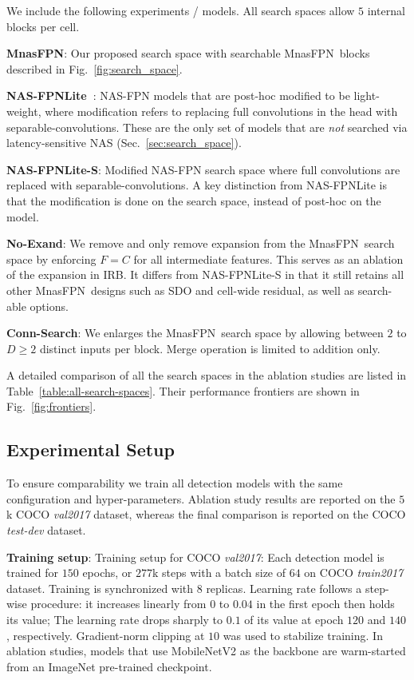 \documentclass[10pt,twocolumn,letterpaper]{article}
\def\Mnasfpn{MnasFPN~}
\def\Mnasfpnnospace{MnasFPN}
\begin{document}
We include the following experiments / models. All search spaces allow $5$ internal blocks per cell. 

{\bf \Mnasfpnnospace}: Our proposed search space with searchable \Mnasfpn blocks described in Fig.~\ref{fig:search_space}. 

{\bf NAS-FPNLite~\cite{ghiasi2019fpn}}: NAS-FPN models that are post-hoc modified to be light-weight, where modification refers to replacing full convolutions in the head with separable-convolutions. These are the only set of models that are {\it not} searched via latency-sensitive NAS (Sec.~\ref{sec:search_space}).

{\bf NAS-FPNLite-S}: Modified NAS-FPN search space where full convolutions are replaced with separable-convolutions. A key distinction from NAS-FPNLite is that the modification is done on the search space, instead of post-hoc on the model.

{\bf No-Exand}: We remove and only remove expansion from the \Mnasfpn search space by enforcing $F=C$ for all intermediate features. This serves as an ablation of the expansion in IRB. It differs from NAS-FPNLite-S in that it still retains all other \Mnasfpn designs such as SDO and cell-wide residual, as well as search-able options.

{\bf Conn-Search}: We enlarges the \Mnasfpn search space by allowing between $2$ to $D\geq 2$ distinct inputs per block. Merge operation is limited to addition only. 




A detailed comparison of all the search spaces in the ablation studies are listed in Table~\ref{table:all-search-spaces}. Their performance frontiers are shown in Fig.~\ref{fig:frontiers}.


\subsection{Experimental Setup}
\label{sec:exp_setup}
To ensure comparability we train all detection models with the same configuration and hyper-parameters. Ablation study results are reported on the $5$k COCO {\it val2017} dataset, whereas the final comparison is reported on the COCO {\it test-dev} dataset. 

{\bf Training setup}:
Training setup for COCO {\it val2017}: Each detection model is trained for $150$ epochs, or $277$k steps with a batch size of $64$ on COCO {\it train2017} dataset. Training is synchronized with $8$ replicas. Learning rate follows a step-wise procedure: it increases linearly from $0$ to $0.04$ in the first epoch then holds its value; The learning rate drops sharply to $0.1$ of its value at epoch $120$ and $140$, respectively. Gradient-norm clipping at $10$ was used to stabilize training.
In ablation studies, models that use MobileNetV2 as the backbone are warm-started from an ImageNet pre-trained checkpoint.
\end{document}
